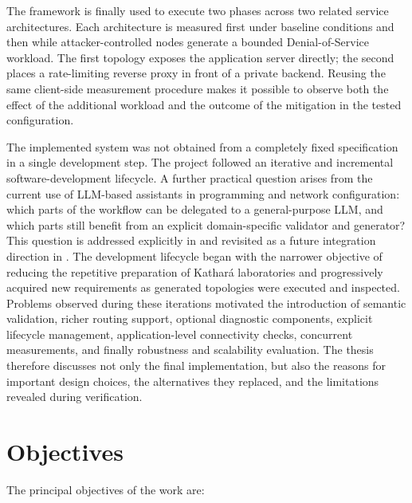 \documentclass[a4paper,10pt,titlepage,twoside]{book}
\numberwithin{equation}{chapter}
\theoremstyle{plain}
\theoremstyle{definition}
\begin{document}
The framework is finally used to execute two phases across two related service
architectures. Each architecture is measured first under baseline conditions
and then while attacker-controlled nodes generate a bounded
Denial-of-Service workload. The first topology exposes the application server
directly; the second places a rate-limiting reverse proxy in front of a private
backend. Reusing the same client-side measurement procedure makes it possible
to observe both the effect of the additional workload and the outcome of the
mitigation in the tested configuration.

The implemented system was not obtained from a completely fixed specification
in a single development step. The project followed an iterative and incremental
software-development lifecycle. A further practical question arises from the
current use of LLM-based assistants in programming and network configuration:
which parts of the workflow can be delegated to a general-purpose LLM, and
which parts still benefit from an explicit domain-specific validator and
generator? This question is addressed explicitly in
 and revisited as a future integration direction in
. The development lifecycle began with the
narrower objective of reducing the repetitive preparation of Kathar\'a
laboratories and progressively acquired
new requirements as generated topologies were executed and inspected. Problems
observed during these iterations motivated the introduction of semantic
validation, richer routing support, optional diagnostic components, explicit
lifecycle management, application-level connectivity checks, concurrent
measurements, and finally robustness and scalability evaluation. The thesis
therefore discusses not only the final implementation, but also the reasons for
important design choices, the alternatives they replaced, and the limitations
revealed during verification.

\section*{Objectives}
{}

The principal objectives of the work are:
\end{document}
